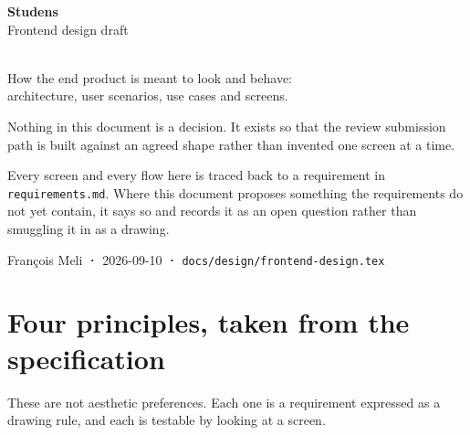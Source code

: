 \documentclass[11pt,a4paper]{article}
\begin{document}
\begin{titlepage}
\centering
\vspace*{2.2cm}
{\sffamily\fontsize{34}{40}\selectfont\bfseries\color{studens}Studens}\\[2mm]
{\sffamily\large\color{muted}Frontend design draft}\\[10mm]
\\[10mm]
{\sffamily\normalsize How the end product is meant to look and behave:\\
architecture, user scenarios, use cases and screens.}\\[16mm]

\begin{tcolorbox}[width=0.86\textwidth,colback=ochrelt,colframe=ochre,
  arc=2pt,fonttitle=\sffamily\bfseries,title={Status: proposed, not decided}]
\sffamily\small
Nothing in this document is a decision. It exists so that the review
submission path is built against an agreed shape rather than invented one
screen at a time.

Every screen and every flow here is traced back to a requirement in
\texttt{requirements.md}. Where this document proposes something the
requirements do not yet contain, it says so and records it as an open question
rather than smuggling it in as a drawing.
\end{tcolorbox}

\vfill
{\sffamily\footnotesize\color{muted}François Meli \textbf{·} 2026-09-10 \textbf{·} \texttt{docs/design/frontend-design.tex}}
\end{titlepage}

\tableofcontents
\newpage

\section{Four principles, taken from the specification}

These are not aesthetic preferences. Each one is a requirement expressed as a
drawing rule, and each is testable by looking at a screen.
\end{document}
